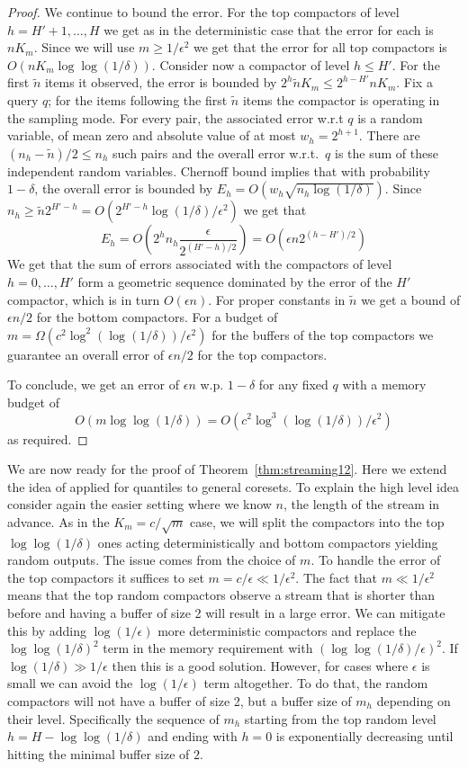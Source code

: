 \documentclass[anon,12pt]{colt2019} %
\newcommand{\eps}{\epsilon}
\begin{document}
{\begin{proof}
We continue to bound the error. For the top compactors of level $h=H'+1,\ldots,H$ we get as in the deterministic case that the error for each is $n K_m$. Since we will use $m \geq 1/\eps^2$ we get that the error for all top compactors is $O(nK_m\log\log(1/\delta))$.
Consider now a compactor of level $h \leq H'$. For the first $\tilde{n}$ items it observed, the error is bounded by $2^h\tilde{n}K_m \leq 2^{h-H'}nK_m$. Fix a query $q$; for the items following the first $\tilde{n}$ items the compactor is operating in the sampling mode. For every pair, the associated error w.r.t $q$ is a random variable, of mean zero and absolute value of at most $w_h=2^{h+1}$. There are $(n_h-\tilde{n})/2 \leq n_h$ such pairs and the overall error w.r.t.\ $q$ is the sum of these independent random variables. Chernoff bound implies that with probability $1-\delta$, the overall error is bounded by $E_h = O(w_h\sqrt{n_h\log(1/\delta)})$. Since $n_h \geq \tilde{n}2^{H'-h} = O(2^{H'-h}\log(1/\delta)/\eps^2)$ we get that
$$ E_h = O\left(2^h n_h\frac{\eps}{2^{(H'-h)/2}}\right) = O(\eps n 2^{(h-H')/2}) $$
We get that the sum of errors associated with the compactors of level $h=0,\ldots,H'$ form a geometric sequence dominated by the error of the $H'$ compactor, which is in turn $O(\eps n)$. For proper constants in $\tilde{n}$ we get a bound of $\eps n/2$ for the bottom compactors. For a budget of $m = \Omega(c^2\log^2(\log(1/\delta))/\eps^2)$ for the buffers of the top compactors we guarantee an overall error of $\eps n/2$ for the top compactors. 

To conclude, we get an error of $\eps n$ w.p. $1-\delta$ for any fixed $q$ with a memory budget of
$$O(m\log\log(1/\delta)) = O\left(c^2\log^3(\log(1/\delta))/\eps^2\right)$$
as required.
\end{proof}

We are now ready for the proof of Theorem~\ref{thm:streaming12}. Here we extend the idea of \cite{DBLP:conf/focs/KarninLL16} applied for quantiles to general coresets. To explain the high level idea consider again the easier setting where we know $n$, the length of the stream in advance. As in the $K_m=c/\sqrt{m}$ case, we will split the compactors into the top $\log\log(1/\delta)$ ones acting deterministically and bottom compactors yielding random outputs. The issue comes from the choice of $m$. To handle the error of the top compactors it suffices to set $m=c/\eps \ll 1/\eps^2$. The fact that $m \ll 1/\eps^2$ means that the top random compactors observe a stream that is shorter than before and having a buffer of size 2 will result in a large error. We can mitigate this by adding $\log(1/\eps)$ more deterministic compactors and replace the $\log\log(1/\delta)^2$ term in the memory requirement with $\left(\log\log(1/\delta)/\eps\right)^2$. If $\log(1/\delta) \gg 1/\eps$ then this is a good solution. However, for cases where $\eps$ is small we can avoid the $\log(1/\eps)$ term altogether. To do that, the random compactors will not have a buffer of size 2, but a buffer size of $m_h$ depending on their level. Specifically the sequence of $m_h$ starting from the top random level $h= H-\log\log(1/\delta)$ and ending with $h=0$ is exponentially decreasing until hitting the minimal buffer size of $2$.

}
\end{document}
